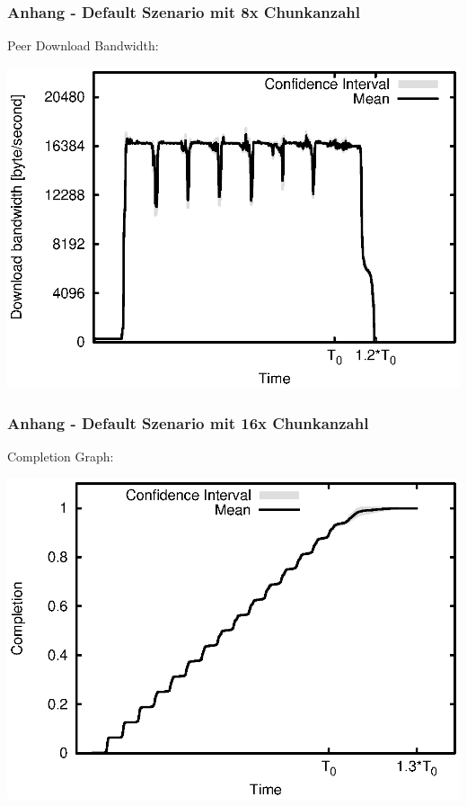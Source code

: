 \begin{frame}
  \frametitle{Anhang - Default Szenario mit 8x Chunkanzahl}
  Peer Download Bandwidth:
  
  \begin{center}
    \includegraphics[width=1\textwidth]{fig/plots/scenario_16_chunk_count_fac_8/plots/GeneratedMeanCurrentDownloadBandwidth.csv.eps}
  \end{center}
\end{frame}



\begin{frame}
  \frametitle{Anhang - Default Szenario mit 16x Chunkanzahl}
  Completion Graph:
  
  \begin{center}
    \includegraphics[width=1\textwidth]{fig/plots/scenario_17_chunk_count_fac_16/plots/GeneratedMeanChunkCompletion.csv.eps}
  \end{center}
\end{frame}


